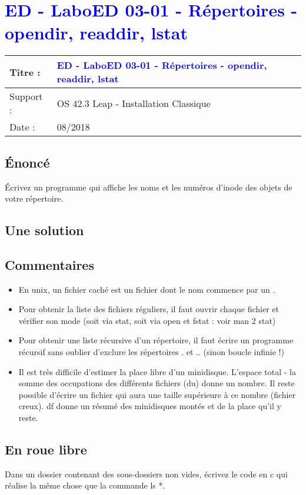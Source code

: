\lstset{language=c}
\renewcommand{\titre}{\textcolor{blue}{ ED - LaboED 03-01 - Répertoires - opendir, readdir, lstat}}

\lhead{ \titre }
\section{{\titre} }

\begin{tabular}{|l|l|}
\hline
Titre : 	& \titre \\\hline
Support : 	& OS 42.3 Leap - Installation Classique \\\hline
Date :		& 08/2018 \\\hline
\end{tabular}

\subsection{Énoncé}

Écrivez un programme qui affiche les noms et les numéros d'inode des objets de votre répertoire.

\subsection{Une solution}



\subsection{Commentaires}

\begin{itemize}
\item En unix, un fichier caché est un fichier dont le nom commence par un .
\item Pour obtenir la liste des fichiers réguliers, il faut ouvrir chaque fichier et vérifier son mode (soit via stat, soit via open et fstat : voir man 2 stat)
\item Pour obtenir une liste récursive d'un répertoire, il faut écrire un programme récursif sans oublier d'exclure les répertoires . et .. (sinon boucle infinie !)
\item Il est très difficile d'estimer la place libre d'un minidisque. L'espace total - la somme des occupations des différents fichiers (du) donne un nombre. Il reste possible d'écrire un fichier qui aura une taille supérieure à ce nombre (fichier creux). df donne un résumé des minidisques montés et de la place qu'il y reste. 
\end{itemize}

\subsection{En roue libre}
Dans un dossier contenant des sous-dossiers non vides, écrivez le code en c qui réalise la même chose que la commande ls *. 
\newpage
